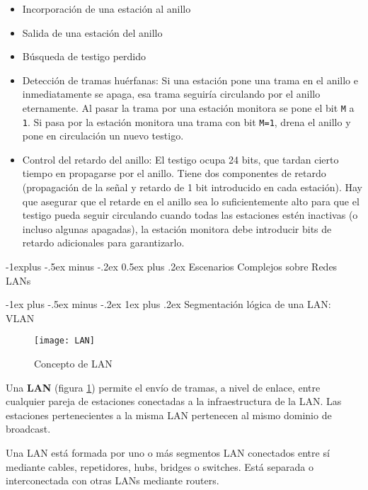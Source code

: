 \documentclass[10pt,portrait, twocolumn]{article}
\makeatletter
\renewcommand{\subsection}{\@startsection{subsection}{2}{0mm}%
                                {-1explus -.5ex minus -.2ex}%
                                {0.5ex plus .2ex}%
                                {\normalfont\normalsize\bfseries}}
\renewcommand{\subsubsection}{\@startsection{subsubsection}{3}{0mm}%
                                {-1ex plus -.5ex minus -.2ex}%
                                {1ex plus .2ex}%
                                {\normalfont\small\bfseries}}
\makeatother
\begin{document}
	\begin{itemize}
		\item Incorporación de una estación al anillo
		\item Salida de una estación del anillo
		\item Búsqueda de testigo perdido
		\item Detección de tramas huérfanas: Si una estación pone una trama en el anillo e inmediatamente se apaga, esa trama seguiría circulando por el anillo eternamente. Al pasar la trama por una estación monitora se pone el bit \texttt{M} a \texttt{1}. Si pasa por la estación monitora una trama con bit \texttt{M=1}, drena el anillo y pone en circulación un nuevo testigo.
		\item Control del retardo del anillo: El testigo ocupa 24 bits, que tardan cierto tiempo en propagarse por el anillo. Tiene dos componentes de retardo (propagación de la señal y retardo de 1 bit introducido en cada estación). Hay que asegurar que el retarde en el anillo sea lo suficientemente alto para que el testigo pueda seguir circulando cuando todas las estaciones estén inactivas (o incluso algunas apagadas), la estación monitora debe introducir bits de retardo adicionales para garantizarlo.
	\end{itemize}

\subsection{Escenarios Complejos sobre Redes LANs}

\subsubsection{Segmentación lógica de una LAN: VLAN}

\begin{figure}[!ht]	
			\centering
		    	\texttt{[image: LAN]}
			\caption{Concepto de LAN}
			\label{fig:LAN}
		\end{figure}  


Una \textbf{LAN} (figura \ref{fig:LAN}) permite el envío de tramas, a nivel de enlace, entre cualquier pareja de estaciones conectadas a la infraestructura de la LAN. Las estaciones pertenecientes a la misma LAN pertenecen al mismo dominio de broadcast.
	
\quad Una LAN está formada por uno o más segmentos LAN conectados entre sí mediante cables, repetidores, hubs, bridges o switches. Está separada o interconectada con otras LANs mediante routers.\\
\end{document}

